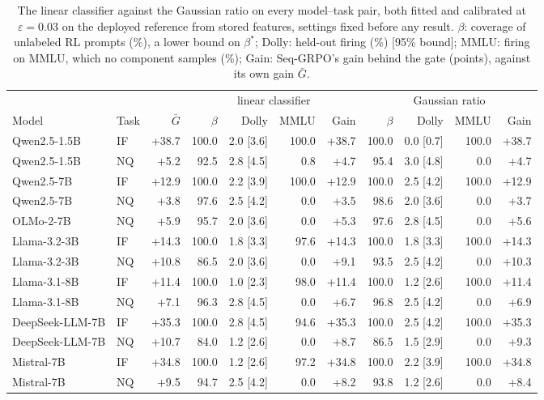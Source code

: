 \begin{table}[t]
\centering
\footnotesize
\setlength{\tabcolsep}{3pt}
\caption{The linear classifier against the Gaussian ratio on every model--task pair, both fitted and calibrated at $\varepsilon=0.03$ on the deployed reference from stored features, settings fixed before any result. $\beta$: coverage of unlabeled RL prompts (\%), a lower bound on $\beta^\ast$; Dolly: held-out firing (\%) [95\% bound]; MMLU: firing on MMLU, which no component samples (\%); Gain: Seq-GRPO's gain behind the gate (points), against its own gain $\bar G$.}
\label{tab:scoregrid}
\begin{tabular}{l l r rrrr rrrr}
\toprule
 & & & \multicolumn{4}{c}{linear classifier} & \multicolumn{4}{c}{Gaussian ratio} \\
\cmidrule(lr){4-7}\cmidrule(lr){8-11}
Model & Task & $\bar G$ & $\beta$ & Dolly & MMLU & Gain & $\beta$ & Dolly & MMLU & Gain \\
\midrule
Qwen2.5-1.5B & IF & +38.7 & 100.0 & 2.0 [3.6] & 100.0 & +38.7 & 100.0 & 0.0 [0.7] & 100.0 & +38.7 \\
Qwen2.5-1.5B & NQ & +5.2 & 92.5 & 2.8 [4.5] & 0.8 & +4.7 & 95.4 & 3.0 [4.8] & 0.0 & +4.7 \\
Qwen2.5-7B & IF & +12.9 & 100.0 & 2.2 [3.9] & 100.0 & +12.9 & 100.0 & 2.5 [4.2] & 100.0 & +12.9 \\
Qwen2.5-7B & NQ & +3.8 & 97.6 & 2.5 [4.2] & 0.0 & +3.5 & 98.6 & 2.0 [3.6] & 0.0 & +3.7 \\
OLMo-2-7B & NQ & +5.9 & 95.7 & 2.0 [3.6] & 0.0 & +5.3 & 97.6 & 2.8 [4.5] & 0.0 & +5.6 \\
Llama-3.2-3B & IF & +14.3 & 100.0 & 1.8 [3.3] & 97.6 & +14.3 & 100.0 & 1.8 [3.3] & 100.0 & +14.3 \\
Llama-3.2-3B & NQ & +10.8 & 86.5 & 2.0 [3.6] & 0.0 & +9.1 & 93.5 & 2.5 [4.2] & 0.0 & +10.3 \\
Llama-3.1-8B & IF & +11.4 & 100.0 & 1.0 [2.3] & 98.0 & +11.4 & 100.0 & 1.2 [2.6] & 100.0 & +11.4 \\
Llama-3.1-8B & NQ & +7.1 & 96.3 & 2.8 [4.5] & 0.0 & +6.7 & 96.8 & 2.5 [4.2] & 0.0 & +6.9 \\
DeepSeek-LLM-7B & IF & +35.3 & 100.0 & 2.8 [4.5] & 94.6 & +35.3 & 100.0 & 2.5 [4.2] & 100.0 & +35.3 \\
DeepSeek-LLM-7B & NQ & +10.7 & 84.0 & 1.2 [2.6] & 0.0 & +8.7 & 86.5 & 1.5 [2.9] & 0.0 & +9.3 \\
Mistral-7B & IF & +34.8 & 100.0 & 1.2 [2.6] & 97.2 & +34.8 & 100.0 & 2.2 [3.9] & 100.0 & +34.8 \\
Mistral-7B & NQ & +9.5 & 94.7 & 2.5 [4.2] & 0.0 & +8.2 & 93.8 & 1.2 [2.6] & 0.0 & +8.4 \\
\bottomrule
\end{tabular}
\end{table}
